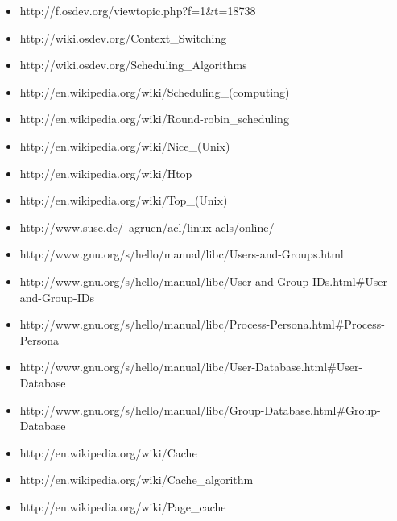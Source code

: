 \documentclass[a4paper,10pt]{article}
\begin{document}
\begin{itemize}
  \item http://f.osdev.org/viewtopic.php?f=1\&t=18738
  \item http://wiki.osdev.org/Context\_Switching
  \item http://wiki.osdev.org/Scheduling\_Algorithms
  \item http://en.wikipedia.org/wiki/Scheduling\_(computing)
  \item http://en.wikipedia.org/wiki/Round-robin\_scheduling
  \item http://en.wikipedia.org/wiki/Nice\_(Unix)
  \item http://en.wikipedia.org/wiki/Htop
  \item http://en.wikipedia.org/wiki/Top\_(Unix)
  \item http://www.suse.de/~agruen/acl/linux-acls/online/
  \item http://www.gnu.org/s/hello/manual/libc/Users-and-Groups.html
  \item http://www.gnu.org/s/hello/manual/libc/User-and-Group-IDs.html\#User-and-Group-IDs
  \item http://www.gnu.org/s/hello/manual/libc/Process-Persona.html\#Process-Persona
  \item http://www.gnu.org/s/hello/manual/libc/User-Database.html\#User-Database
  \item http://www.gnu.org/s/hello/manual/libc/Group-Database.html\#Group-Database
  \item http://en.wikipedia.org/wiki/Cache
  \item http://en.wikipedia.org/wiki/Cache\_algorithm
  \item http://en.wikipedia.org/wiki/Page\_cache 
\end{itemize}
   
\end{document}
